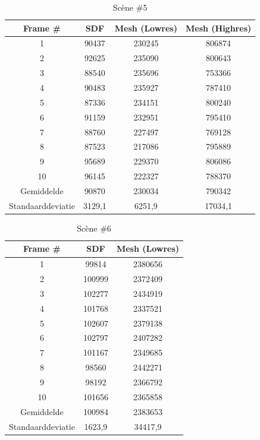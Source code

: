 \documentclass[12pt, a4paper]{article}
\begin{document}
\begin{table}[H]
	\centering
	\begin{tabular}{| c | c c c |}
		\hline
		Frame \# & SDF & Mesh (Lowres) & Mesh (Highres) \\
		\hline
		1 &90437 &230245 &806874 \\
		2 &92625 &235090 &800643 \\
		3 &88540 &235696 &753366 \\
		4 &90483 &235927 &787410 \\
		5 &87336 &234151 &800240 \\
		6 &91159 &232951 &795410 \\
		7 &88760 &227497 &769128 \\
		8 &87523 &217086 &795889 \\
		9 &95689 &229370 &806086 \\
		10 &96145 &222327 &788370 \\
		\hline
		Gemiddelde &90870 &230034 &790342 \\
		Standaarddeviatie &3129,1 &6251,9 &17034,1 \\
		\hline
	\end{tabular}
	\caption{Scène \#5}
\end{table}
\begin{table}[H]
	\centering
	\begin{tabular}{| c | c c |}
		\hline
		Frame \# & SDF & Mesh (Lowres) \\
		\hline
		1 &99814 &2380656 \\
		2 &100999 &2372409 \\
		3 &102277 &2434919 \\
		4 &101768 &2337521 \\
		5 &102607 &2379138 \\
		6 &102797 &2407282 \\
		7 &101167 &2349685 \\
		8 &98560 &2442271 \\
		9 &98192 &2366792 \\
		10 &101656 &2365858 \\
		\hline
		Gemiddelde &100984 &2383653 \\
		Standaarddeviatie &1623,9 &34417,9 \\
		\hline
	\end{tabular}
	\caption{Scène \#6}
\end{table}
\end{document}
